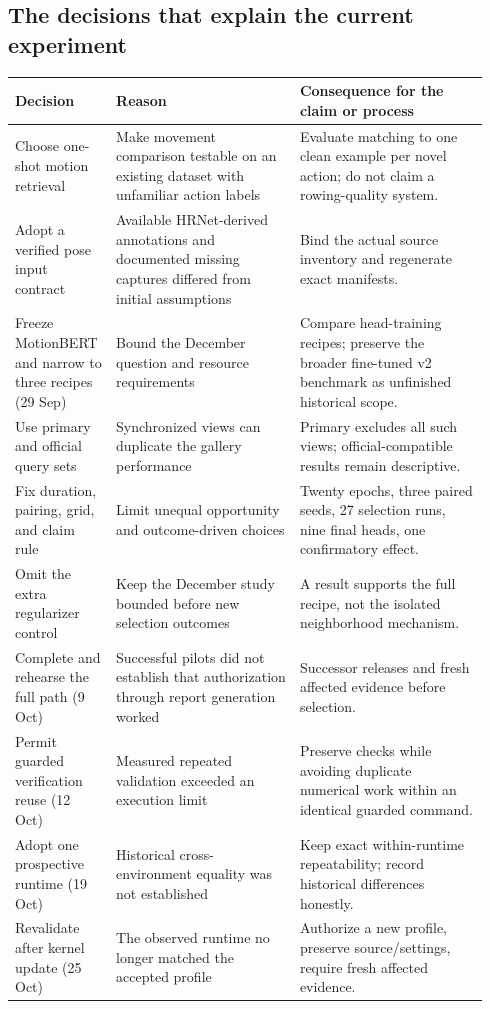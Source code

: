 \subsection{The decisions that explain the current experiment}
\begin{longtable}{@{}P{0.19\linewidth}P{0.37\linewidth}P{0.38\linewidth}@{}}
\toprule Decision & Reason & Consequence for the claim or process\\\midrule\endhead
Choose one-shot motion retrieval & Make movement comparison testable on an
existing dataset with unfamiliar action labels & Evaluate matching to one clean
example per novel action; do not claim a rowing-quality system.\\\addlinespace
Adopt a verified pose input contract & Available HRNet-derived annotations and
documented missing captures differed from initial assumptions & Bind the actual
source inventory and regenerate exact manifests.\\\addlinespace
Freeze MotionBERT and narrow to three recipes (29 Sep) & Bound the December
question and resource requirements & Compare head-training recipes; preserve
the broader fine-tuned v2 benchmark as unfinished historical scope.\\\addlinespace
Use primary and official query sets & Synchronized views can duplicate the
gallery performance & Primary excludes all such views; official-compatible
results remain descriptive.\\\addlinespace
Fix duration, pairing, grid, and claim rule & Limit unequal opportunity and
outcome-driven choices & Twenty epochs, three paired seeds, 27 selection runs,
nine final heads, one confirmatory effect.\\\addlinespace
Omit the extra regularizer control & Keep the December study bounded before
new selection outcomes & A result supports the full recipe, not the isolated
neighborhood mechanism.\\\addlinespace
Complete and rehearse the full path (9 Oct) & Successful pilots did not establish
that authorization through report generation worked & Successor releases and
fresh affected evidence before selection.\\\addlinespace
Permit guarded verification reuse (12 Oct) & Measured repeated validation exceeded
an execution limit & Preserve checks while avoiding duplicate numerical work
within an identical guarded command.\\\addlinespace
Adopt one prospective runtime (19 Oct) & Historical cross-environment equality
was not established & Keep exact within-runtime repeatability; record historical
differences honestly.\\\addlinespace
Revalidate after kernel update (25 Oct) & The observed runtime no longer matched
the accepted profile & Authorize a new profile, preserve source/settings, require
fresh affected evidence.\\\bottomrule
\end{longtable}

